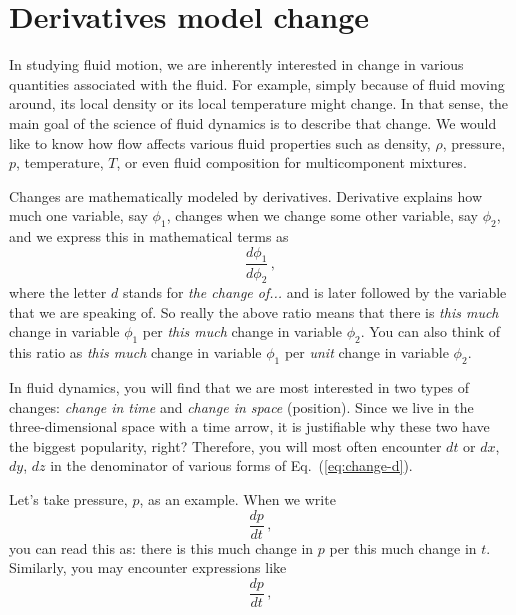 

\section{Derivatives model change}

In studying fluid motion, we are inherently interested in change in various quantities associated with the fluid. For example, simply because of fluid moving around, its local density or its local temperature might change. In that sense, the main goal of the science of fluid dynamics is to describe that change. We would like to know how flow affects various fluid properties such as density, $\rho$, pressure, $p$, temperature, $T$, or even fluid composition for multicomponent mixtures.

Changes are mathematically modeled by derivatives. Derivative explains how much one variable, say $\phi_1$, changes when we change some other variable, say $\phi_2$, and we express this in mathematical terms as
\begin{equation*}\label{eq:change-d}
\frac{d \phi_1}{d \phi_2} \, ,
\end{equation*}
where the letter $d$ stands for \textit{the change of...} and is later followed by the variable that we are speaking of. So really the above ratio means that there is \textit{this much} change in variable $\phi_1$ per \textit{this much} change in variable $\phi_2$. You can also think of this ratio as \textit{this much} change in variable $\phi_1$ per \textit{unit} change in variable $\phi_2$.

In fluid dynamics, you will find that we are most interested in two types of changes: \textit{change in time} and \textit{change in space} (position). Since we live in the three-dimensional space with a time arrow, it is justifiable why these two have the biggest popularity, right? Therefore, you will most often encounter $dt$ or $dx$, $dy$, $dz$ in the denominator of various forms of Eq.~(\ref{eq:change-d}).

Let's take pressure, $p$, as an example. When we write
\begin{equation*}\label{eq:change-p}
\frac{d p}{d t} \, ,
\end{equation*}
you can read this as: there is this much change in $p$ per this much change in $t$.
Similarly, you may encounter expressions like
\begin{equation*}\label{eq:change-p}
\frac{d p}{d t} \, ,
\end{equation*}


